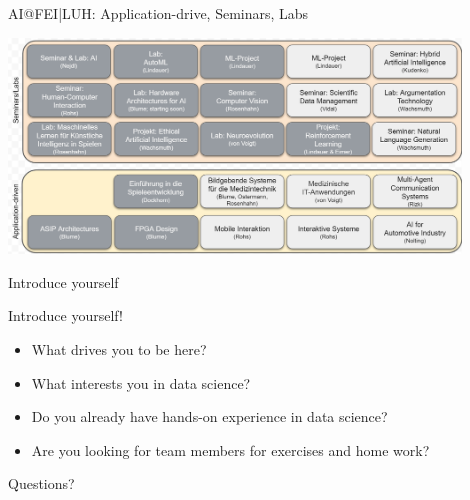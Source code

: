 \documentclass[aspectratio=169,handout]{../latex_main/tntbeamer}  %
\begin{document}
\begin{frame}[c]{AI@FEI|LUH: Application-drive, Seminars, Labs}

\vspace{-2em}
\centering
\includegraphics[width=0.9\textwidth]{figures/ai_apps_sems}

\end{frame}
\begin{frame}[c]{Introduce yourself}


\begin{center}
\huge
    Introduce yourself!
\end{center}

\begin{itemize}
    \item What drives you to be here?
    \item What interests you in data science?
    \item Do you already have hands-on experience in data science?
    \item Are you looking for team members for exercises and home work?
\end{itemize}

\end{frame}


\begin{frame}[c]{}

\centering
\huge
Questions?

\end{frame}

	
\end{document}
